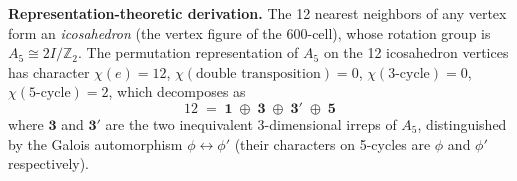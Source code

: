 \documentclass[12pt,a4paper]{article}
\theoremstyle{definition}
\begin{document}
\textbf{Representation-theoretic derivation.}  The 12 nearest neighbors of any vertex form an \emph{icosahedron} (the vertex figure of the 600-cell), whose rotation group is $A_5\cong 2I/\mathbb{Z}_2$.  The permutation representation of $A_5$ on the 12 icosahedron vertices has character $\chi(e)=12$, $\chi(\text{double transposition})=0$, $\chi(\text{3-cycle})=0$, $\chi(\text{5-cycle})=2$, which decomposes as
\begin{equation}
12 \;=\; \mathbf{1} \;\oplus\; \mathbf{3} \;\oplus\; \mathbf{3'} \;\oplus\; \mathbf{5}
\label{eq:A5decomp}
\end{equation}
where $\mathbf{3}$ and $\mathbf{3'}$ are the two inequivalent 3-dimensional irreps of $A_5$, distinguished by the Galois automorphism $\phi\leftrightarrow\phi'$ (their characters on 5-cycles are $\phi$ and $\phi'$ respectively).
\end{document}
